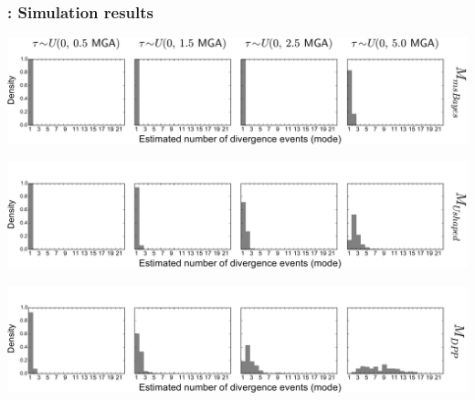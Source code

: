 {\begin{frame}[noframenumbering]
    \frametitle{\dppmsbayes: Simulation results}
        \centerline{
        \includegraphics[width=\textwidth]{../images/old_old_power_psi_mode.pdf}}
        \vspace{0mm}
        \centerline{
        \includegraphics[width=\textwidth]{../images/old_u-shaped_power_psi_mode_headless.pdf}}
        \vspace{0mm}
        \centerline{
        \includegraphics[width=\textwidth]{../images/old_dpp_power_psi_mode_headless.pdf}}
\end{frame}

}
